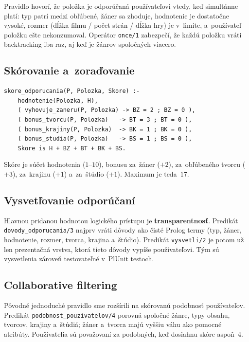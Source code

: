 \documentclass[11pt,a4paper]{article}
\begin{document}
\noindent
Pravidlo hovorí, že položka je odporúčaná používateľovi vtedy,
keď simultánne platí: typ patrí medzi obľúbené, žáner sa
zhoduje, hodnotenie je dostatočne vysoké, rozmer (dĺžka filmu /
počet strán / dĺžka hry) je v~limite, a~používateľ položku ešte
nekonzumoval. Operátor \texttt{once/1} zabezpečí, že každú
položku vráti backtracking iba raz, aj keď je žánrov spoločných
viacero.

\subsection{Skórovanie a~zoraďovanie}

\begin{lstlisting}
skore_odporucania(P, Polozka, Skore) :-
    hodnotenie(Polozka, H),
    ( vyhovuje_zaneru(P, Polozka) -> BZ = 2 ; BZ = 0 ),
    ( bonus_tvorcu(P, Polozka)   -> BT = 3 ; BT = 0 ),
    ( bonus_krajiny(P, Polozka)  -> BK = 1 ; BK = 0 ),
    ( bonus_studia(P, Polozka)   -> BS = 1 ; BS = 0 ),
    Skore is H + BZ + BT + BK + BS.
\end{lstlisting}

Skóre je súčet hodnotenia ($1$--$10$), bonusu za~žáner ($+2$),
za~obľúbeného tvorcu ($+3$), za~krajinu ($+1$) a~za~štúdio
($+1$). Maximum je teda~$17$.

\subsection{Vysvetľovanie odporúčaní}

Hlavnou pridanou hodnotou logického prístupu je
\textbf{transparentnosť}. Predikát
\texttt{dovody\_odporucania/3} najprv vráti dôvody ako čisté
Prolog termy (typ, žáner, hodnotenie, rozmer, tvorca, krajina
a~štúdio). Predikát \texttt{vysvetli/2} je potom už len
prezentačná vrstva, ktorá tieto dôvody vypíše používateľovi.
Tým sú vysvetlenia zároveň testovateľné v~PlUnit testoch.

\subsection{Collaborative filtering}

Pôvodné jednoduché pravidlo  sme
rozšírili na skórovanú podobnosť používateľov. Predikát
\texttt{podobnost\_pouzivatelov/4} porovná spoločné žánre, typy
obsahu, tvorcov, krajiny a~štúdiá; žáner a~tvorca majú vyššiu váhu
ako pomocné atribúty. Používatelia sú považovaní za podobných, keď
dosiahnu skóre aspoň~4.
\end{document}
